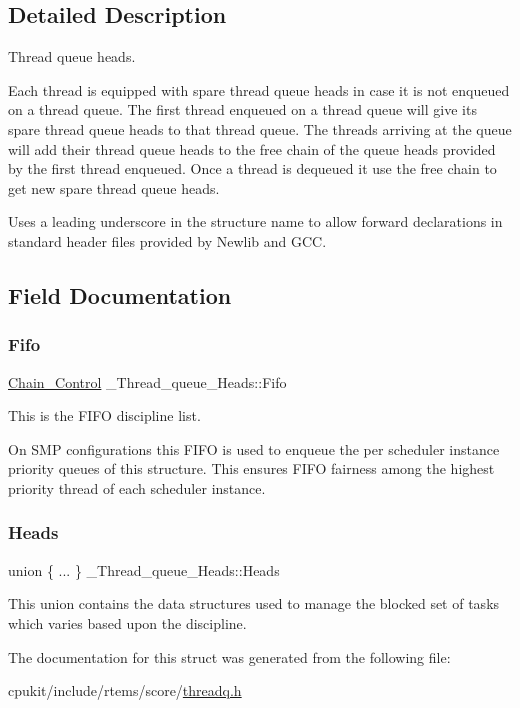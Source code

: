 \subsection{Detailed Description}
Thread queue heads. 

Each thread is equipped with spare thread queue heads in case it is not enqueued on a thread queue. The first thread enqueued on a thread queue will give its spare thread queue heads to that thread queue. The threads arriving at the queue will add their thread queue heads to the free chain of the queue heads provided by the first thread enqueued. Once a thread is dequeued it use the free chain to get new spare thread queue heads.

Uses a leading underscore in the structure name to allow forward declarations in standard header files provided by Newlib and G\+CC. 

\subsection{Field Documentation}
\mbox{\label{struct__Thread__queue__Heads_a0810b5b56b238a61d7cf664b28e3d337}} 
\subsubsection{\texorpdfstring{Fifo}{Fifo}}
{\footnotesize\ttfamily \mbox{\hyperlink{unionChain__Control}{Chain\+\_\+\+Control}} \+\_\+\+Thread\+\_\+queue\+\_\+\+Heads\+::\+Fifo}



This is the F\+I\+FO discipline list. 

On S\+MP configurations this F\+I\+FO is used to enqueue the per scheduler instance priority queues of this structure. This ensures F\+I\+FO fairness among the highest priority thread of each scheduler instance. \mbox{\label{struct__Thread__queue__Heads_a21d754973bc1115a827336f826e2d142}} 
\subsubsection{\texorpdfstring{Heads}{Heads}}
{\footnotesize\ttfamily union \{ ... \}   \+\_\+\+Thread\+\_\+queue\+\_\+\+Heads\+::\+Heads}

This union contains the data structures used to manage the blocked set of tasks which varies based upon the discipline. 

The documentation for this struct was generated from the following file\+:\begin{DoxyCompactItemize}
\item 
cpukit/include/rtems/score/\mbox{\hyperlink{threadq_8h}{threadq.\+h}}\end{DoxyCompactItemize}
